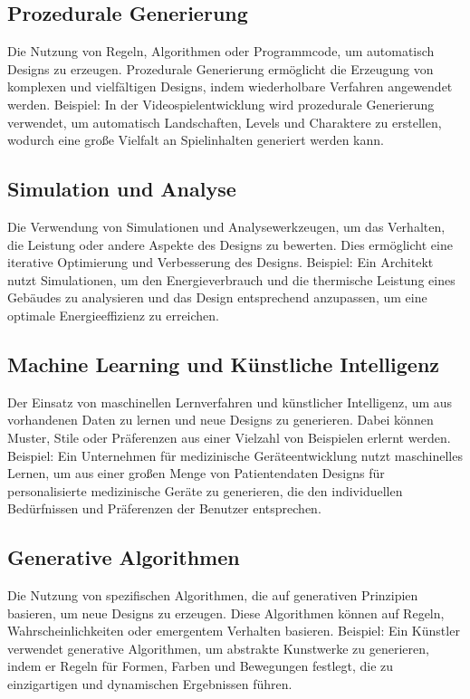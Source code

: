 \subsection*{Prozedurale Generierung}
Die Nutzung von Regeln, Algorithmen oder Programmcode, um automatisch Designs zu erzeugen. Prozedurale Generierung ermöglicht die Erzeugung von komplexen und vielfältigen Designs, indem wiederholbare Verfahren angewendet werden. Beispiel: In der Videospielentwicklung wird prozedurale Generierung verwendet, um automatisch Landschaften, Levels und Charaktere zu erstellen, wodurch eine große Vielfalt an Spielinhalten generiert werden kann.

\subsection*{Simulation und Analyse}
Die Verwendung von Simulationen und Analysewerkzeugen, um das Verhalten, die Leistung oder andere Aspekte des Designs zu bewerten. Dies ermöglicht eine iterative Optimierung und Verbesserung des Designs. Beispiel: Ein Architekt nutzt Simulationen, um den Energieverbrauch und die thermische Leistung eines Gebäudes zu analysieren und das Design entsprechend anzupassen, um eine optimale Energieeffizienz zu erreichen.

\subsection*{Machine Learning und Künstliche Intelligenz}
Der Einsatz von maschinellen Lernverfahren und künstlicher Intelligenz, um aus vorhandenen Daten zu lernen und neue Designs zu generieren. Dabei können Muster, Stile oder Präferenzen aus einer Vielzahl von Beispielen erlernt werden. Beispiel: Ein Unternehmen für medizinische Geräteentwicklung nutzt maschinelles Lernen, um aus einer großen Menge von Patientendaten Designs für personalisierte medizinische Geräte zu generieren, die den individuellen Bedürfnissen und Präferenzen der Benutzer entsprechen.

\subsection*{Generative Algorithmen}
Die Nutzung von spezifischen Algorithmen, die auf generativen Prinzipien basieren, um neue Designs zu erzeugen. Diese Algorithmen können auf Regeln, Wahrscheinlichkeiten oder emergentem Verhalten basieren. Beispiel: Ein Künstler verwendet generative Algorithmen, um abstrakte Kunstwerke zu generieren, indem er Regeln für Formen, Farben und Bewegungen festlegt, die zu einzigartigen und dynamischen Ergebnissen führen.

